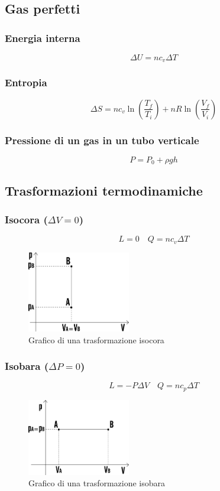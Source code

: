 \documentclass[a4paper]{article}
\theoremstyle{break}
\theoremstyle{break}
\theoremstyle{break}
\theoremstyle{break}
\begin{document}
\subsection{Gas perfetti}
\subsubsection{Energia interna}
\[
\Delta U = n c_v \Delta T
\] 

\subsubsection{Entropia}
\[
\Delta S = n c_v \ln \left( \frac{T_f}{T_i} \right) + n R \ln \left( \frac{V_f}{V_i} \right)
\] 

\subsubsection{Pressione di un gas in un tubo verticale}
\[
P = P_0 + \rho g h
\] 

\subsection{Trasformazioni termodinamiche}
\subsubsection{Isocora (\( \Delta V = 0 \))}
\[
L = 0 \quad Q = n c_v \Delta T
\] 
\begin{figure}[H]
  \begin{center}
    \includegraphics[width=0.4\textwidth]{isocora}
  \end{center}
  \caption{Grafico di una trasformazione isocora}
\end{figure}


\subsubsection{Isobara (\( \Delta P = 0 \))}
\[
L = -P \Delta V \quad Q = n c_p \Delta T
\] 
\begin{figure}[H]
  \begin{center}
    \includegraphics[width=0.4\textwidth]{isobara}
  \end{center}
  \caption{Grafico di una trasformazione isobara}
\end{figure}
\end{document}
